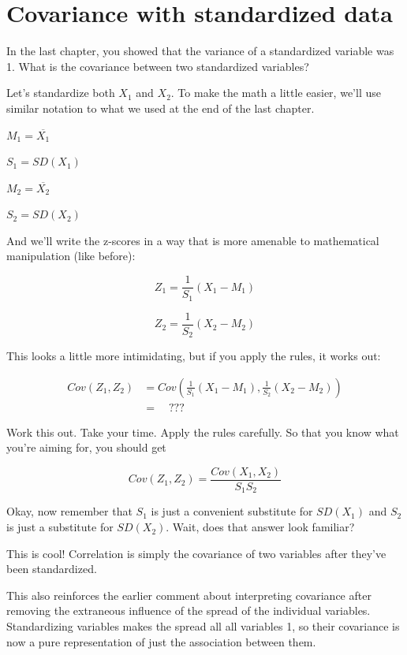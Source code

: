 \documentclass[
]{book}
\begin{document}
\hypertarget{covariance-standardized}{%
\section{Covariance with standardized data}\label{covariance-standardized}}

In the last chapter, you showed that the variance of a standardized variable was 1. What is the covariance between two standardized variables?

Let's standardize both \(X_{1}\) and \(X_{2}\). To make the math a little easier, we'll use similar notation to what we used at the end of the last chapter.

\(M_{1} = \overline{X_{1}}\)

\(S_{1} = SD(X_{1})\)

\(M_{2} = \overline{X_{2}}\)

\(S_{2} = SD(X_{2})\)

And we'll write the z-scores in a way that is more amenable to mathematical manipulation (like before):

\[
Z_{1} = \frac{1}{S_{1}}\left(X_{1} - M_{1}\right)
\]

\[
Z_{2} = \frac{1}{S_{2}}\left(X_{2} - M_{2}\right)
\]

This looks a little more intimidating, but if you apply the rules, it works out:

\begin{align}
Cov(Z_{1}, Z_{2}) &= Cov\left( \frac{1}{S_{1}}\left(X_{1} - M_{1}\right), \frac{1}{S_{2}}\left(X_{2} - M_{2}\right) \right) \\
    &= \quad ???
\end{align}

Work this out. Take your time. Apply the rules carefully. So that you know what you're aiming for, you should get

\[
Cov(Z_{1}, Z_{2}) = \frac{Cov\left( X_{1}, X_{2} \right)}{S_{1} S_{2}}
\]

Okay, now remember that \(S_{1}\) is just a convenient substitute for \(SD(X_{1})\) and \(S_{2}\) is just a substitute for \(SD(X_{2})\). Wait, does that answer look familiar?

This is cool! Correlation is simply the covariance of two variables after they've been standardized.

This also reinforces the earlier comment about interpreting covariance after removing the extraneous influence of the spread of the individual variables. Standardizing variables makes the spread all all variables 1, so their covariance is now a pure representation of just the association between them.
\end{document}
